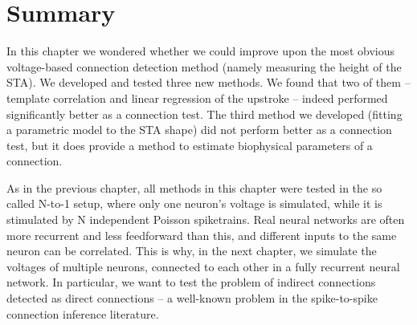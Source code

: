 













\clearpage
\section{Summary}

In this chapter we wondered whether we could improve upon the most obvious voltage-based connection detection method (namely measuring the height of the STA). We developed and tested three new methods. We found that two of them -- template correlation and linear regression of the upstroke -- indeed performed significantly better as a connection test. The third method we developed (fitting a parametric model to the STA shape) did not perform better as a connection test, but it does provide a method to estimate biophysical parameters of a connection.

As in the previous chapter, all methods in this chapter were tested in the so called N-to-1 setup, where only one neuron's voltage is simulated, while it is stimulated by N independent Poisson spiketrains. Real neural networks are often more recurrent and less feedforward than this, and different inputs to the same neuron can be correlated. This is why, in the next chapter, we simulate the voltages of multiple neurons, connected to each other in a fully recurrent neural network. In particular, we want to test the problem of indirect connections detected as direct connections -- a well-known problem in the spike-to-spike connection inference literature.
